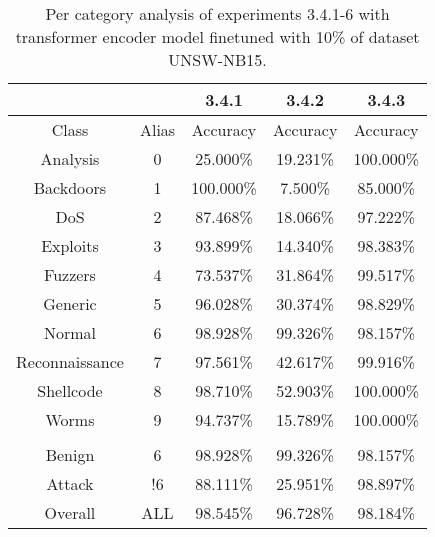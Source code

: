 \begin{table}[htb]
    \centering
    \begin{tabular}{@{}ccccc@{}}
        \toprule
         &  & 3.4.1 & 3.4.2 & 3.4.3 \\
        \midrule
        Class &  Alias &  Accuracy &  Accuracy &  Accuracy \\
        Analysis &  0 &  25.000\% &  19.231\% &  100.000\% \\
        Backdoors &  1 &  100.000\% &  7.500\% &  85.000\% \\
        DoS &  2 &  87.468\% &  18.066\% &  97.222\% \\
        Exploits &  3 &  93.899\% &  14.340\% &  98.383\% \\
        Fuzzers &  4 &  73.537\% &  31.864\% &  99.517\% \\
        Generic &  5 &  96.028\% &  30.374\% &  98.829\% \\
        Normal &  6 &  98.928\% &  99.326\% &  98.157\% \\
        Reconnaissance &  7 &  97.561\% &  42.617\% &  99.916\% \\
        Shellcode &  8 &  98.710\% &  52.903\% &  100.000\% \\
        Worms &  9 &  94.737\% &  15.789\% &  100.000\% \\
         \\
        Benign &  6 &  98.928\% &  99.326\% &  98.157\% \\
        Attack &  !6 &  88.111\% &  25.951\% &  98.897\% \\
        Overall &  ALL &  98.545\% &  96.728\% &  98.184\% \\
        \bottomrule
    \end{tabular}
    \caption{Per category analysis of experiments 3.4.1-6 with transformer encoder model finetuned with 10\% of dataset UNSW-NB15.}
    \label{table:results:lstm:class_flows15_10}
\end{table}